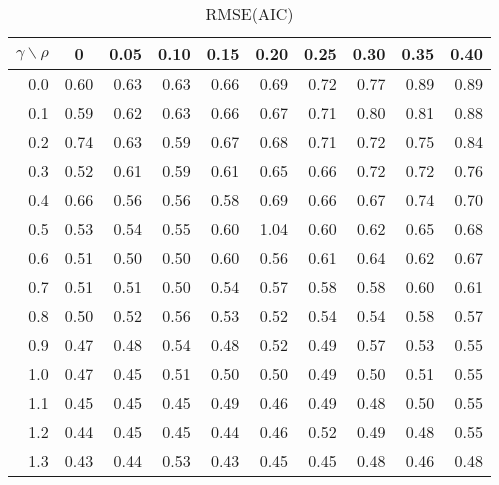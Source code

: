 \documentclass[12pt]{article}
\begin{document}
\begin{table}[!tbp]
\caption{RMSE(AIC)}
 \begin{center}
 \begin{tabular}{r|rrrrrrrrr}\hline\hline
\multicolumn{1}{c|}{$\gamma\backslash\rho$}&\multicolumn{1}{c}{0}&\multicolumn{1}{c}{0.05}&\multicolumn{1}{c}{0.10}&\multicolumn{1}{c}{0.15}&\multicolumn{1}{c}{0.20}&\multicolumn{1}{c}{0.25}&\multicolumn{1}{c}{0.30}&\multicolumn{1}{c}{0.35}&\multicolumn{1}{c}{0.40}\tabularnewline
\hline


0.0&0.60&0.63&0.63&0.66&0.69&0.72&0.77&0.89&0.89\tabularnewline
0.1&0.59&0.62&0.63&0.66&0.67&0.71&0.80&0.81&0.88\tabularnewline
0.2&0.74&0.63&0.59&0.67&0.68&0.71&0.72&0.75&0.84\tabularnewline
0.3&0.52&0.61&0.59&0.61&0.65&0.66&0.72&0.72&0.76\tabularnewline
0.4&0.66&0.56&0.56&0.58&0.69&0.66&0.67&0.74&0.70\tabularnewline
0.5&0.53&0.54&0.55&0.60&1.04&0.60&0.62&0.65&0.68\tabularnewline
0.6&0.51&0.50&0.50&0.60&0.56&0.61&0.64&0.62&0.67\tabularnewline
0.7&0.51&0.51&0.50&0.54&0.57&0.58&0.58&0.60&0.61\tabularnewline
0.8&0.50&0.52&0.56&0.53&0.52&0.54&0.54&0.58&0.57\tabularnewline
0.9&0.47&0.48&0.54&0.48&0.52&0.49&0.57&0.53&0.55\tabularnewline
1.0&0.47&0.45&0.51&0.50&0.50&0.49&0.50&0.51&0.55\tabularnewline
1.1&0.45&0.45&0.45&0.49&0.46&0.49&0.48&0.50&0.55\tabularnewline
1.2&0.44&0.45&0.45&0.44&0.46&0.52&0.49&0.48&0.55\tabularnewline
1.3&0.43&0.44&0.53&0.43&0.45&0.45&0.48&0.46&0.48\tabularnewline
\hline
\end{tabular}

\end{center}

\end{table}

%
\end{document}

